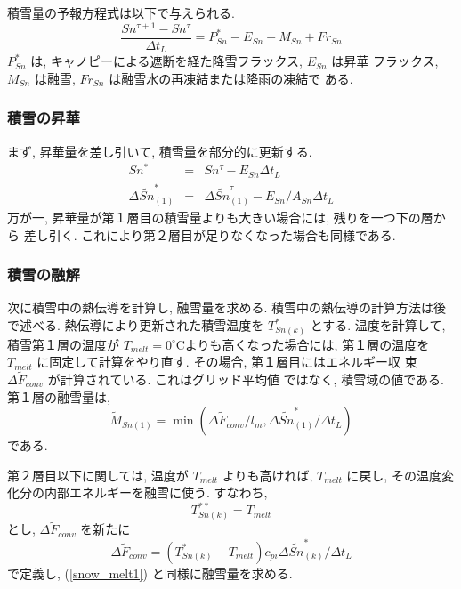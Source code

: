 積雪量の予報方程式は以下で与えられる. 
\begin{equation}
 \frac{Sn^{\tau+1}-Sn^{\tau}}{\Delta t_L} = P_{Sn}^* - E_{Sn} - M_{Sn} + Fr_{Sn}
\end{equation}
$P_{Sn}^*$ は, キャノピーによる遮断を経た降雪フラックス, $E_{Sn}$ は昇華
フラックス, $M_{Sn}$ は融雪, $Fr_{Sn}$ は融雪水の再凍結または降雨の凍結で
ある. 

\subsubsection{積雪の昇華}

まず, 昇華量を差し引いて, 積雪量を部分的に更新する. 
\begin{eqnarray}
 Sn^* &=& Sn^{\tau} - E_{Sn} \Delta t_L \\
 \Delta \widetilde{Sn}_{(1)}^* &=& \Delta \widetilde{Sn}_{(1)}^{\tau} - E_{Sn}/A_{Sn} \Delta t_L
\end{eqnarray}
万が一, 昇華量が第１層目の積雪量よりも大きい場合には, 残りを一つ下の層から
差し引く. これにより第２層目が足りなくなった場合も同様である. 

\subsubsection{積雪の融解}

次に積雪中の熱伝導を計算し, 融雪量を求める. 
積雪中の熱伝導の計算方法は後で述べる. 
熱伝導により更新された積雪温度を $T_{Sn(k)}^*$ とする. 
温度を計算して, 積雪第１層の温度が
$T_{melt} = 0^{\circ}$Cよりも高くなった場合には, 第１層の温度を
$T_{melt}$ に固定して計算をやり直す. その場合, 第１層目にはエネルギー収
束 $\Delta \widetilde{F}_{conv}$ が計算されている. これはグリッド平均値
ではなく, 積雪域の値である. 
第１層の融雪量は, 
\begin{equation}
 \widetilde{M}_{Sn(1)} = \min(\Delta \widetilde{F}_{conv} / l_m, \Delta \widetilde{Sn}_{(1)}^*/\Delta t_L ) \label{snow_melt1}
\end{equation}
である. 

第２層目以下に関しては, 温度が $T_{melt}$ よりも高ければ, $T_{melt}$ に戻し, 
その温度変化分の内部エネルギーを融雪に使う. 
すなわち, 
\begin{equation}
 T_{Sn(k)}^{**} = T_{melt} 
\end{equation}
とし, $\Delta \widetilde{F}_{conv}$ を新たに
\begin{equation}
 \Delta \widetilde{F}_{conv} = ( T_{Sn(k)}^* - T_{melt} ) c_{pi}\Delta \widetilde{Sn}_{(k)}^*/\Delta t_L
\end{equation}
で定義し, (\ref{snow_melt1}) と同様に融雪量を求める. 

